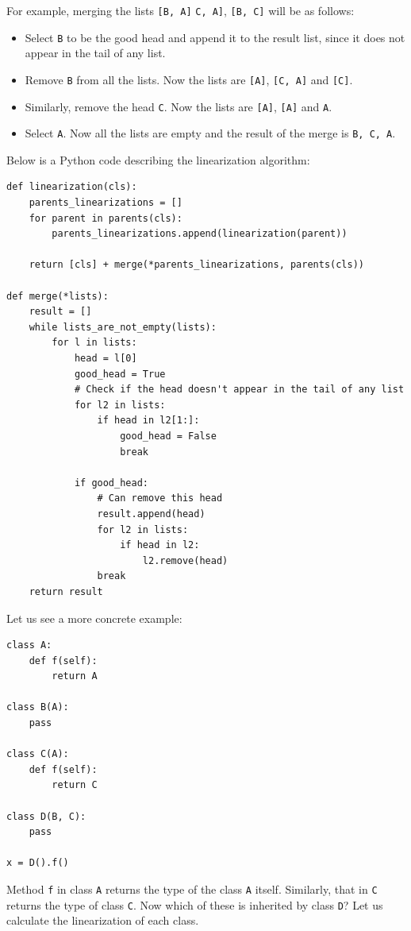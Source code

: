 For example, merging the lists \lstinline|[B, A]| \lstinline|C, A]|, \lstinline|[B, C]| will be as follows:
\begin{itemize}
	\item Select \lstinline|B| to be the good head and append it to the result list, since it does not appear in the tail of any list.
	\item Remove \lstinline|B| from all the lists. Now the lists are \lstinline|[A]|, \lstinline|[C, A]| and \lstinline|[C]|.
	\item Similarly, remove the head \lstinline|C|. Now the lists are \lstinline|[A]|, \lstinline|[A]| and \lstinline|A|.
	\item Select \lstinline|A|. Now all the lists are empty and the result of the merge is \lstinline|B, C, A|.
\end{itemize}

Below is a Python code describing the linearization algorithm:

\begin{lstlisting}
def linearization(cls):
	parents_linearizations = []
	for parent in parents(cls):
		parents_linearizations.append(linearization(parent))
	
	return [cls] + merge(*parents_linearizations, parents(cls))
	
def merge(*lists):
	result = []
	while lists_are_not_empty(lists):
		for l in lists:
			head = l[0]
			good_head = True
			# Check if the head doesn't appear in the tail of any list
			for l2 in lists:
				if head in l2[1:]:
					good_head = False
					break
			
			if good_head:
				# Can remove this head
				result.append(head)
				for l2 in lists:
					if head in l2:
						l2.remove(head)
				break
	return result		
\end{lstlisting}

Let us see a more concrete example:

\begin{lstlisting}
class A:
	def f(self):
		return A

class B(A):
	pass

class C(A):
	def f(self):
		return C
		
class D(B, C):
	pass
	
x = D().f()
\end{lstlisting}

Method \lstinline|f| in class \lstinline|A| returns the type of the class \lstinline|A| itself. Similarly, that in \lstinline|C| returns the type of class \lstinline|C|. Now which of these is inherited by class \lstinline|D|? Let us calculate the linearization of each class.

